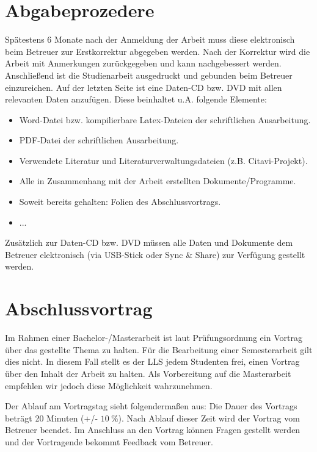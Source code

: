 \documentclass[utf8, a4paper, 11pt, parskip, pointlessnumbers]{scrreprt}
\begin{document}
\chapter{Abgabeprozedere}
Spätestens 6 Monate nach der Anmeldung der Arbeit muss diese elektronisch beim Betreuer zur Erstkorrektur abgegeben werden. Nach der Korrektur wird die Arbeit mit Anmerkungen zurückgegeben und kann nachgebessert werden. Anschließend ist die Studienarbeit ausgedruckt und gebunden beim Betreuer einzureichen. Auf der letzten Seite ist eine Daten-CD bzw. DVD mit allen relevanten Daten anzufügen. Diese beinhaltet u.A. folgende Elemente:
	\begin{itemize}
		\item Word-Datei bzw. kompilierbare Latex-Dateien der schriftlichen Ausarbeitung.
		\item PDF-Datei der schriftlichen Ausarbeitung.
		\item Verwendete Literatur und Literaturverwaltungsdateien (z.B. Citavi-Projekt).
		\item Alle in Zusammenhang mit der Arbeit erstellten Dokumente/Programme.
		\item Soweit bereits gehalten: Folien des Abschlussvortrags. 
		\item ...
	\end{itemize}
Zusätzlich zur Daten-CD bzw. DVD müssen alle Daten und Dokumente dem Betreuer elektronisch (via USB-Stick oder Sync \& Share) zur Verfügung gestellt werden.

\chapter{Abschlussvortrag}
Im Rahmen einer Bachelor-/Masterarbeit ist laut Prüfungsordnung ein Vortrag über das gestellte Thema zu halten. Für die Bearbeitung einer Semesterarbeit gilt dies nicht. In diesem Fall stellt es der LLS jedem Studenten frei, einen Vortrag über den Inhalt der Arbeit zu halten. Als Vorbereitung auf die Masterarbeit empfehlen wir jedoch diese Möglichkeit wahrzunehmen.

Der Ablauf am Vortragstag sieht folgendermaßen aus: Die Dauer des Vortrags beträgt 20 Minuten (+/- $10~\si{\percent}$). Nach Ablauf dieser Zeit wird der Vortrag vom Betreuer beendet. Im Anschluss an den Vortrag können Fragen gestellt werden und der Vortragende bekommt Feedback vom Betreuer.
\end{document}
